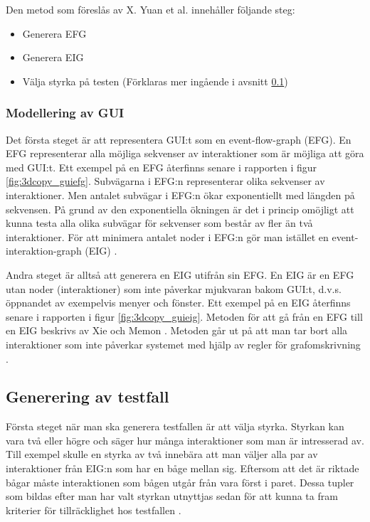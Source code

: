 Den metod som föreslås av X. Yuan et al. \cite{yuan2011gui} innehåller följande steg:

\begin{itemize}
	\item [1] Generera EFG
	\item [2] Generera EIG
	\item [3] Välja styrka på testen (Förklaras mer ingående i avsnitt \ref{sec:testcase-generation-holmberg})
\end{itemize}

\subsubsection{Modellering av GUI}

Det första steget är att representera GUI:t som en event-flow-graph (EFG). En EFG representerar alla möjliga sekvenser av interaktioner som är möjliga att göra med GUI:t. Ett exempel på en EFG återfinns senare i rapporten i figur \ref{fig:3dcopy_guiefg}. Subvägarna i EFG:n representerar olika sekvenser av interaktioner. Men antalet subvägar i EFG:n ökar exponentiellt med längden på sekvensen. På grund av den exponentiella ökningen är det i princip omöjligt att kunna testa alla olika subvägar för sekvenser som består av fler än två interaktioner. För att minimera antalet noder i EFG:n gör man istället en event-interaktion-graph (EIG) \cite{yuan2011gui}. 

Andra steget är alltså att generera en EIG utifrån sin EFG. En EIG är en EFG utan noder (interaktioner) som inte påverkar mjukvaran bakom GUI:t, d.v.s. öppnandet av exempelvis menyer och fönster. Ett exempel på en EIG återfinns senare i rapporten i figur \ref{fig:3dcopy_guieig}. Metoden för att gå från en EFG till en EIG beskrivs av Xie och Memon \cite{xie2008using}. Metoden går ut på att man tar bort alla interaktioner som inte påverkar systemet med hjälp av regler för grafomskrivning \cite{yuan2011gui}.

\subsection{Generering av testfall}
\label{sec:testcase-generation-holmberg}

Första steget när man ska generera testfallen är att välja styrka. Styrkan kan vara två eller högre och säger hur många interaktioner som man är intresserad av. Till exempel skulle en styrka av två innebära att man väljer alla par av interaktioner från EIG:n som har en båge mellan sig. Eftersom att det är riktade bågar måste interaktionen som bågen utgår från vara först i paret. Dessa tupler som bildas efter man har valt styrkan utnyttjas sedan för att kunna ta fram kriterier för tillräcklighet hos testfallen \cite{yuan2011gui}. 

